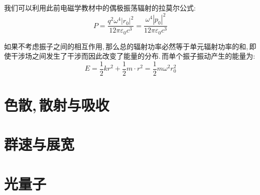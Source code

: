 我们可以利用此前电磁学教材中的偶极振荡辐射的拉莫尔公式:
\[P=\frac{q^2\omega^4 |r_0|^2}{12\pi\varepsilon_0 c^3}=\frac{\omega^4 |p_0|^2}{12\pi\varepsilon_0 c^3}\]

如果不考虑振子之间的相互作用,\,那么总的辐射功率必然等于单元辐射功率的和,\,即使干涉场之间发生了干涉而因此改变了能量的分布.\,而单个振子振动产生的能量为:
\[E=\frac{1}{2}k r^2+\frac{1}{2}m\cdot{r}^2=\frac{1}{2}m\omega^2r_0^2\]


\section{色散,\,散射与吸收}

\section{群速与展宽}

\section{光量子}

